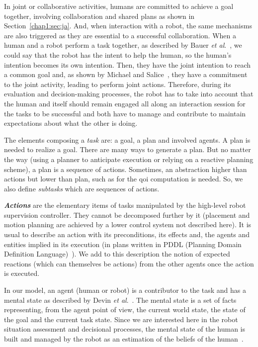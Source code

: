\documentclass[a4paper,11pt,twoside]{StyleThese}
\begin{document}
In joint or collaborative activities, humans are committed to achieve a goal together, involving collaboration and shared plans as shown in Section~\ref{chap1:sec:ja}. And, when interaction with a robot, the same mechanisms are also triggered as they are essential to a successful collaboration. When a human and a robot perform a task together, as described by Bauer \textit{et al}.~\cite{bauer_2008_collab}, we could say that the robot has the intent to help the human, so the human's intention becomes its own intention. Then, they have the joint intention to reach a common goal and, as shown by Michael and Salice~\cite{michael_2017_commitment}, they have a commitment to the joint activity, leading to perform joint actions. Therefore, during its evaluation and decision-making processes, the robot has to take into account that the human and itself should remain engaged all along an interaction session for the tasks to be successful and both have to manage and contribute to maintain expectations about what the other is doing. 

The elements composing a \textit{task} are: a goal, a plan and involved agents. A plan is needed to realize a goal. There are many ways to generate a plan. But no matter the way (using a planner to anticipate execution or relying on a reactive planning scheme), a plan is a sequence of actions. Sometimes, an abstraction higher than actions but lower than plan, such as for the \acrshort{qoi} computation is needed. So, we also define \emph{subtasks} which are sequences of actions. 

\textbf{\textit{Actions}} are the elementary items of tasks manipulated by the high-level robot supervision controller. They cannot be decomposed further by it (\eg placement and motion planning are achieved by a lower control system not described here). It is usual to describe an action with its preconditions, its effects and, the agents and entities implied in its execution (\eg in plans written in PDDL (Planning Domain Definition Language)~\cite{ghallab_98_pddl}). We add to this description the notion of expected reactions (which can themselves be actions) from the other agents once the action is executed.

In our model, an agent (human or robot) is a contributor to the task and has a mental state as described by Devin \textit{et al}.~\cite{devin_2016_implemented}. The mental state is a set of facts representing, from the agent point of view, the current world state, the state of the goal and the current task state. Since we are interested here in the robot situation assessment and decisional processes, the mental state of the human is built and managed by the robot as an estimation of the beliefs of the human~\cite{milliez_2014_framework, hiatt_2017_modeling,tabrez_2020}.
\end{document}
